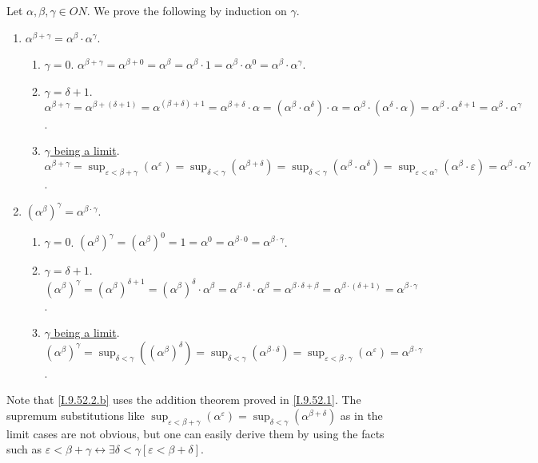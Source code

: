 \documentclass[12pt]{article}
\theoremstyle{definition}
\newenvironment{customthm}[1]
  {\renewcommand\theinnercustomthm{#1}\innercustomthm}
  {\endinnercustomthm}
\begin{document}
\begin{customthm}{I.9.52}
  Let $\alpha,\beta,\gamma\in ON$. We prove the following by induction on $\gamma$.
  \begin{enumerate}
    \item\underline{$\alpha^{\beta+\gamma}=\alpha^\beta\cdot\alpha^\gamma$}.
    \begin{enumerate}\label{I.9.52.1}
      \item\underline{$\gamma=0$}. $\alpha^{\beta+\gamma}=\alpha^{\beta+0}=\alpha^\beta=\alpha^\beta\cdot 1=\alpha^\beta\cdot\alpha^0=\alpha^\beta\cdot\alpha^\gamma$.
      \item\underline{$\gamma=\delta+1$}. $\alpha^{\beta+\gamma}=\alpha^{\beta+(\delta+1)}=\alpha^{(\beta+\delta)+1}=\alpha^{\beta+\delta}\cdot\alpha=(\alpha^\beta\cdot\alpha^\delta)\cdot\alpha=\alpha^\beta\cdot(\alpha^\delta\cdot\alpha)=\alpha^\beta\cdot\alpha^{\delta+1}=\alpha^\beta\cdot\alpha^\gamma$.
      \item\underline{$\gamma$ being a limit}. $\alpha^{\beta+\gamma}=\sup_{\varepsilon<\beta+\gamma}(\alpha^\varepsilon)=\sup_{\delta<\gamma}(\alpha^{\beta+\delta})=\sup_{\delta<\gamma}(\alpha^\beta\cdot\alpha^\delta)=\sup_{\varepsilon<\alpha^\gamma}(\alpha^\beta\cdot\varepsilon)=\alpha^\beta\cdot\alpha^\gamma$.
    \end{enumerate}
    \item\underline{$(\alpha^\beta)^\gamma=\alpha^{\beta\cdot\gamma}$}.
    \begin{enumerate}
      \item\underline{$\gamma=0$}. $(\alpha^\beta)^\gamma=(\alpha^\beta)^0=1=\alpha^{0}=\alpha^{\beta\cdot 0}=\alpha^{\beta\cdot\gamma}$.
      \item\underline{$\gamma=\delta+1$}.\label{I.9.52.2.b} $(\alpha^\beta)^\gamma=(\alpha^\beta)^{\delta+1}=(\alpha^\beta)^{\delta}\cdot\alpha^\beta=\alpha^{\beta\cdot\delta}\cdot\alpha^\beta=\alpha^{\beta\cdot\delta+\beta}=\alpha^{\beta\cdot(\delta+1)}=\alpha^{\beta\cdot\gamma}$.
      \item\underline{$\gamma$ being a limit}. $(\alpha^\beta)^\gamma=\sup_{\delta<\gamma}((\alpha^\beta)^\delta)=\sup_{\delta<\gamma}(\alpha^{\beta\cdot\delta})=\sup_{\varepsilon<\beta\cdot\gamma}(\alpha^\varepsilon)=\alpha^{\beta\cdot\gamma}$.
    \end{enumerate}
  \end{enumerate}
  Note that \ref{I.9.52.2.b} uses the addition theorem proved in \ref{I.9.52.1}. The supremum substitutions like $\sup_{\varepsilon<\beta+\gamma}(\alpha^\varepsilon)=\sup_{\delta<\gamma}(\alpha^{\beta+\delta})$ as in the limit cases are not obvious, but one can easily derive them by using the facts such as $\varepsilon<\beta+\gamma\leftrightarrow\exists\delta<\gamma[\varepsilon<\beta+\delta]$.
\end{customthm}
\end{document}
